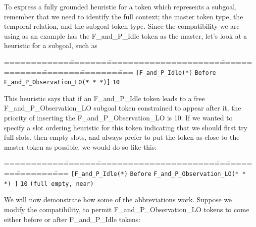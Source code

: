 To express a fully grounded heuristic for a token which represents a subgoal, 
remember that we need to identify the full context; the master token type, the
temporal relation, and the subgoal token type.  Since the compatibility we
are using as an example has the F\_and\_P\_Idle token as the master, let's
look at a heuristic for a subgoal, such as

\begin{tabbing}
============\========\======================\==============\========\========\====\kill
{\tt[F\_and\_P\_Idle(*)} \> {\tt Before} \> {\tt  F\_and\_P\_Observation\_LO(* * *)]} \> {\tt 10} \\
\end{tabbing}

This heuristic says that if an  F\_and\_P\_Idle token leads to a free
F\_and\_P\_Observation\_LO subgoal token constrained to appear after it,
the priority of inserting the F\_and\_P\_Observation\_LO is 10.  
If we wanted to specify a slot ordering heuristic for this token indicating
that we should first try full slots, then empty slots, and always prefer
to put the token as close to the master token as possible, we would do so like
this:
\begin{tabbing}
===========\=======\=======================\===\========\========\====\kill
{\tt[F\_and\_P\_Idle(*)} \> {\tt Before} \> {\tt  F\_and\_P\_Observation\_LO(* * *) ]} \> {\tt 10}  \> {\tt (full empty, near)}\\
\end{tabbing}

We will now demonstrate how some of the abbreviations work.
Suppose we modify the compatibility, to permit F\_and\_P\_Observation\_LO
tokens to come either before or after F\_and\_P\_Idle tokens:

